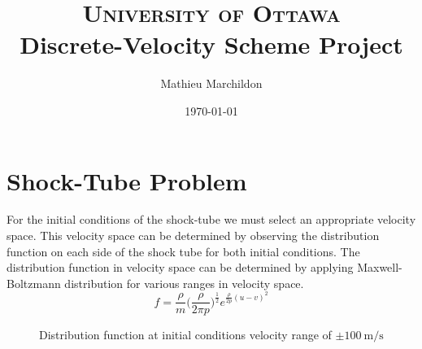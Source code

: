 \documentclass[paper=a4, fontsize=12pt]{scrartcl}
\title{
	\normalfont \normalsize
	\textsc{University of Ottawa} \\ [5pt]
	\huge Discrete-Velocity Scheme Project
}
\author{Mathieu Marchildon} %
\date{\normalsize \today} %
\begin{document}
\maketitle


\section*{Shock-Tube Problem}
For the initial conditions of the shock-tube we must select an appropriate velocity space.
This velocity space can be determined by observing the distribution function on each side of
the shock tube for both initial conditions.
The distribution function in velocity space can be determined by applying Maxwell-Boltzmann distribution
for various ranges in velocity space.
\[
        f = \frac{\rho}{m} \Big( \frac{\rho}{2 \pi p}\Big)^{\frac{1}{2}}e^{\frac{\rho}{2 p}(u-v)^2}
\]
\begin{figure}[H]%
    \centering
    \qquad
    \caption{Distribution function at initial conditions \newline velocity range of $\pm \SI{100}{\meter \per \second}$
 }
    \label{fig:init_100}%
\end{figure}
\end{document}
